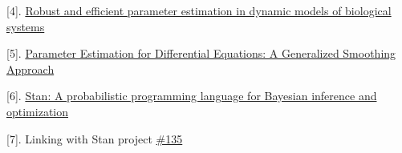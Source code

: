 \documentclass[11pt]{article}
\begin{document}
{[}4{]}.
\href{http://bmcsystbiol.biomedcentral.com/articles/10.1186/s12918-015-0219-2}{Robust
and efficient parameter estimation in dynamic models of biological
systems}

{[}5{]}.
\href{http://faculty.bscb.cornell.edu/~hooker/ODE_Estimation.pdf}{Parameter
Estimation for Differential Equations: A Generalized Smoothing Approach}

{[}6{]}.
\href{http://www.stat.columbia.edu/~gelman/research/published/stan_jebs_2.pdf}{Stan:
A probabilistic programming language for Bayesian inference and
optimization}

{[}7{]}. Linking with Stan project
\href{https://github.com/JuliaDiffEq/DifferentialEquations.jl/issues/135}{\#135}


    
    
    
    
\end{document}
